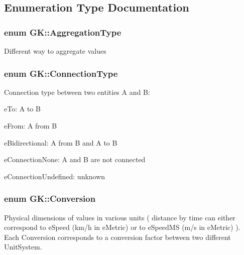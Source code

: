 \subsection{Enumeration Type Documentation}
\subsubsection[{\texorpdfstring{Aggregation\+Type}{AggregationType}}]{\setlength{\rightskip}{0pt plus 5cm}enum {\bf G\+K\+::\+Aggregation\+Type}}\hypertarget{namespaceGK_ae682f9fb77047e45fa91c27e569b8fee}{}\label{namespaceGK_ae682f9fb77047e45fa91c27e569b8fee}
Different way to aggregate values 
\subsubsection[{\texorpdfstring{Connection\+Type}{ConnectionType}}]{\setlength{\rightskip}{0pt plus 5cm}enum {\bf G\+K\+::\+Connection\+Type}}\hypertarget{namespaceGK_acff655917cf02cfbda984b465457ce74}{}\label{namespaceGK_acff655917cf02cfbda984b465457ce74}
Connection type between two entities A and B\+:
\begin{DoxyItemize}
\item e\+To\+: A to B
\item e\+From\+: A from B
\item e\+Bidirectional\+: A from B and A to B
\item e\+Connection\+None\+: A and B are not connected
\item e\+Connection\+Undefined\+: unknown 
\end{DoxyItemize}
\subsubsection[{\texorpdfstring{Conversion}{Conversion}}]{\setlength{\rightskip}{0pt plus 5cm}enum {\bf G\+K\+::\+Conversion}}\hypertarget{namespaceGK_a3a072c41e7de00bafcfa83c9ce7fe760}{}\label{namespaceGK_a3a072c41e7de00bafcfa83c9ce7fe760}
Physical dimensions of values in various units ( \textquotesingle{}distance by time\textquotesingle{} can either correspond to e\+Speed (km/h in e\+Metric) or to e\+Speed\+MS (m/s in e\+Metric) ). Each Conversion corresponds to a conversion factor between two different Unit\+System. 

